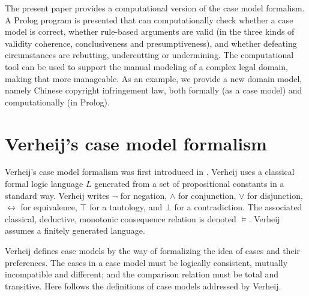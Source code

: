 \documentclass{IOS-Book-Article}
\begin{document}

The present paper provides a computational version of the case model formalism. A Prolog program is presented that can computationally check whether a case model is correct, whether rule-based arguments are valid (in the three kinds of validity coherence, conclusiveness and presumptiveness), and whether defeating circumstances are rebutting, undercutting or undermining. The computational tool can be used to support the manual modeling of a complex legal domain, making that more manageable. As an example, we provide a new domain model, namely Chinese copyright infringement law, both formally (as a case model) and computationally (in Prolog).

\section{Verheij's case model formalism}

\noindent Verheij's case model formalism was first introduced in \citep{Verheij2016Correct}. Verheij uses a classical formal logic  language $L$ generated from a set of propositional constants in a standard way. Verheij writes $\neg$ for negation, $\wedge$ for conjunction, $\vee$ for disjunction, $\leftrightarrow$ for equivalence, $\top$ for a tautology, and $\bot$ for a contradiction. The associated classical, deductive, monotonic consequence relation is denoted $\vDash$. Verheij assumes a finitely generated language. 

Verheij defines case models by the way of formalizing the idea of cases and their preferences. The cases in a case model must be logically consistent, mutually incompatible and different; and the comparison relation must be total and transitive. Here follows the definitions of case models addressed by Verheij.
\end{document}
